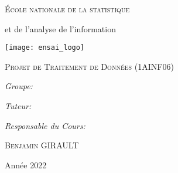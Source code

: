 \begin{titlepage}
\begin{center}

{\LARGE\scshape
École nationale de la statistique

et de l'analyse de l'information}

\vspace{5mm}
\texttt{[image: ensai\_logo]}
\vspace{1cm}

\textsc{\LARGE Projet de Traitement de Données (1AINF06)}

\vspace{0.5cm}

{\huge
\HRule

\vspace{0.4cm}

\bfseries\makeatletter\@title\makeatother

\vspace{0.4cm}

\HRule}

\vspace{1.5cm}


\begin{flushleft}
    \Large
    \emph{Groupe:}

    \scshape\makeatletter\@author\makeatother
\end{flushleft}

\begin{flushright}
    \Large
    \emph{Tuteur:}

    \textsc{\tuteur}

    \emph{Responsable du Cours:}

    \textsc{Benjamin GIRAULT}
\end{flushright}


\vfill
{\large Année 2022}
\end{center}
\end{titlepage}
